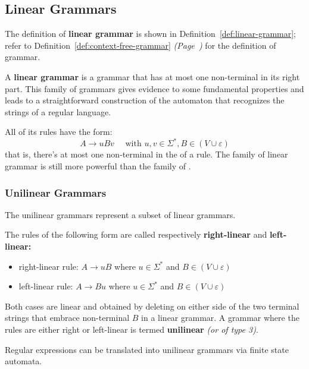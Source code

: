 \documentclass[english]{article}
\begin{document}
\subsection{Linear Grammars}

The definition of \textbf{linear grammar} is shown in Definition~\ref{def:linear-grammar};
refer to Definition~\ref{def:context-free-grammar} \textit{(Page~\pageref{def:context-free-grammar})} for the definition of \CF grammar.

\begin{definition}
  \label{def:linear-grammar}
  A \textbf{linear grammar} is a \CF grammar that has at most one non-terminal in its right part.
  This family of grammars gives evidence to some fundamental properties and leads to a straightforward construction of the automaton that recognizes the strings of a regular language.
\end{definition}

All of its rules have the form:
\[A \rightarrow uBv \quad \text{ with } u, v \in \Sigma^\ast, B \in \left(V \cup \varepsilon\right) \]
that is, there's at most one non-terminal in the \RP of a rule.
The family of linear grammar is still more powerful than the family of \RE.

\subsubsection{Unilinear Grammars}

The unilinear grammars represent a subset of linear grammars.

The rules of the following form are called respectively \textbf{right-linear} and \textbf{left-linear:}

\begin{itemize}
  \item right-linear rule: \(A \rightarrow uB \) where \(u \in \Sigma^\ast\) and \(B \in \left( V \cup \varepsilon \right)\)
  \item left-linear rule: \(A \rightarrow Bu \) where \(u \in \Sigma^\ast\) and \(B \in \left( V \cup \varepsilon \right)\)
\end{itemize}

Both cases are linear and obtained by deleting on either side of the two terminal strings that embrace non-terminal \(B\) in a linear grammar.
A grammar where the rules are either right or left-linear is termed \textbf{unilinear} \textit{(or of type 3)}.

Regular expressions can be translated into unilinear grammars via finite state automata.
\end{document}
